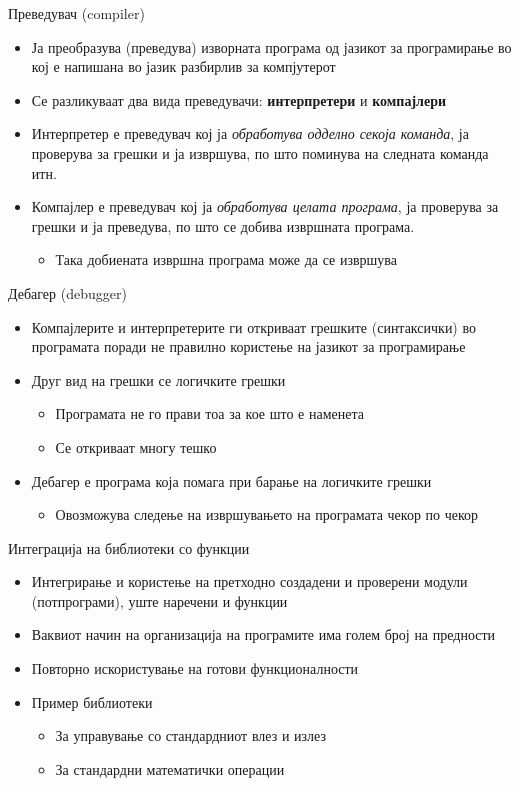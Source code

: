 \begin{frame}{Преведувач (compiler)}
\begin{itemize}
  \item Ја преобразува (преведува) изворната програма од јазикот за програмирање
  во кој е напишана во јазик разбирлив за компјутерот
  \item Се разликуваат два вида преведувачи: \textbf{интерпретери} и \textbf{компајлери} 
  \item Интерпретер е преведувач кој ја \emph{обработува одделно секоја команда}, ја
  проверува за грешки и ја извршува, по што поминува на следната команда  итн.
  \item Компајлер е преведувач кој ја \emph{обработува целата програма}, ја проверува
  за грешки и ја преведува, по што се добива извршната програма.
  \begin{itemize}
  \item Така добиената извршна програма може да се извршува
  \end{itemize}
\end{itemize}
\end{frame}

\begin{frame}{Дебагер (debugger)}
\begin{itemize}
  \item Компајлерите и интерпретерите ги откриваат грешките (синтаксички) во
  програмата поради не правилно користење на јазикот за програмирање
  \item Друг вид на грешки се логичките грешки
  \begin{itemize}
  \item Програмата не го прави тоа за кое што е наменета 
  \item Се откриваат многу тешко
  \end{itemize}
  \item Дебагер е програма која помага при барање на логичките грешки
  \begin{itemize}
  \item Овозможува следење на извршувањето на програмата чекор по чекор
  \end{itemize}
\end{itemize}
\end{frame}

\begin{frame}{Интеграција на библиотеки со функции}
\begin{itemize}
  \item Интегрирање и користење на претходно создадени и проверени модули (потпрограми), уште наречени и функции
  \item Ваквиот начин на организација на програмите има голем број на предности
  \item Повторно искористување на готови функционалности
  \item Пример библиотеки
  \begin{itemize}
    \item За управување со стандардниот влез и излез
    \item За стандардни математички операции 
  \end{itemize}
\end{itemize}
\end{frame}

